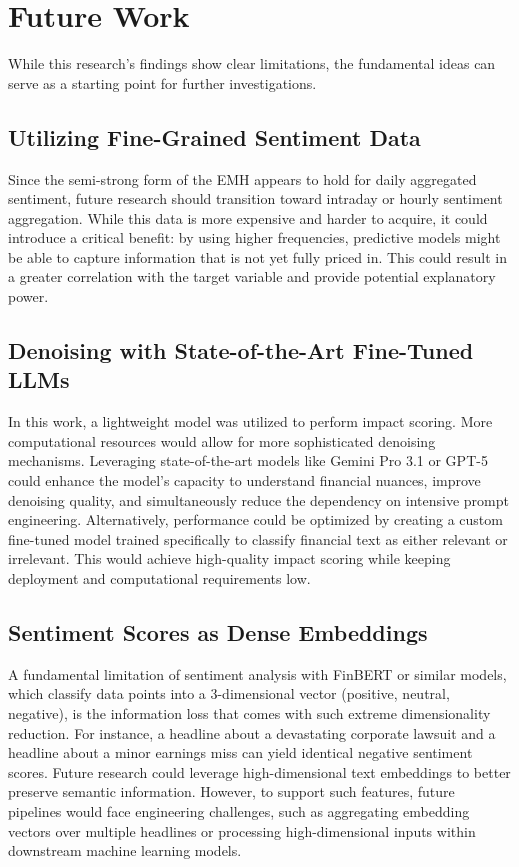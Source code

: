 \documentclass[Master,english,IEEE]{twbook}
\begin{document}
\chapter{Future Work}
While this research's findings show clear limitations, the fundamental ideas can serve as a starting point for further investigations.

\section{Utilizing Fine-Grained Sentiment Data}
Since the semi-strong form of the EMH appears to hold for daily aggregated sentiment, future research should transition toward intraday or hourly sentiment aggregation. While this data is more expensive and harder to acquire, it could introduce a critical benefit: by using higher frequencies, predictive models might be able to capture information that is not yet fully priced in. This could result in a greater correlation with the target variable and provide potential explanatory power.

\section{Denoising with State-of-the-Art Fine-Tuned LLMs}
In this work, a lightweight model was utilized to perform impact scoring. More computational resources would allow for more sophisticated denoising mechanisms. Leveraging state-of-the-art models like Gemini Pro 3.1 or GPT-5 could enhance the model's capacity to understand financial nuances, improve denoising quality, and simultaneously reduce the dependency on intensive prompt engineering. Alternatively, performance could be optimized by creating a custom fine-tuned model trained specifically to classify financial text as either relevant or irrelevant. This would achieve high-quality impact scoring while keeping deployment and computational requirements low.

\section{Sentiment Scores as Dense Embeddings}
A fundamental limitation of sentiment analysis with FinBERT or similar models, which classify data points into a 3-dimensional vector (positive, neutral, negative), is the information loss that comes with such extreme dimensionality reduction. For instance, a headline about a devastating corporate lawsuit and a headline about a minor earnings miss can yield identical negative sentiment scores. Future research could leverage high-dimensional text embeddings to better preserve semantic information. However, to support such features, future pipelines would face engineering challenges, such as aggregating embedding vectors over multiple headlines or processing high-dimensional inputs within downstream machine learning models.
\end{document}
